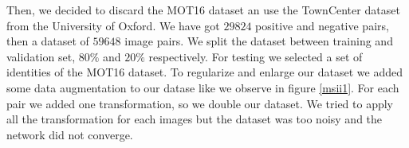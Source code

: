 \documentclass[12pt, a4paper, titlepage,twoside,openright]{article}
\begin{document}
Then, we decided to discard the MOT16 dataset an use the TownCenter dataset \cite{townCenter} from the University of Oxford. We have got $29824$ positive and negative pairs, then a dataset of $59648$ image pairs. We split the dataset between training and validation set, $80 \%$ and $20 \%$ respectively. For testing we selected a set of identities of the MOT16 dataset. To regularize and enlarge our dataset we added some data augmentation to our datase like we observe in figure \ref{msii1}. For each pair we added one transformation, so we double our dataset. We tried to apply all the transformation for each images but the dataset was too noisy and the network did not converge.






\begin{figure}[H]
		
\centering


\end{figure}
\end{document}
